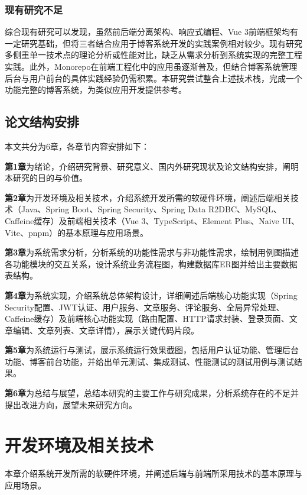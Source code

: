 \documentclass[UTF8,AutoFakeBold=1,AutoFakeSlant,zihao=-4]{SCAU}
\begin{document}
\subsubsection{现有研究不足}

综合现有研究可以发现，虽然前后端分离架构、响应式编程、Vue 3前端框架均有一定研究基础，但将三者结合应用于博客系统开发的实践案例相对较少。现有研究多侧重单一技术点的理论分析或性能对比，缺乏从需求分析到系统实现的完整工程实践。此外，Monorepo在前端工程化中的应用虽逐渐普及，但结合博客系统管理后台与用户前台的具体实践经验仍需积累。本研究尝试整合上述技术栈，完成一个功能完整的博客系统，为类似应用开发提供参考。

\subsection{论文结构安排}

本文共分为6章，各章节内容安排如下：

\textbf{第1章}为绪论，介绍研究背景、研究意义、国内外研究现状及论文结构安排，阐明本研究的目的与价值。

\textbf{第2章}为开发环境及相关技术，介绍系统开发所需的软硬件环境，阐述后端相关技术（Java、Spring Boot、Spring Security、Spring Data R2DBC、MySQL、Caffeine缓存）及前端相关技术（Vue 3、TypeScript、Element Plus、Naive UI、Vite、pnpm）的基本原理与应用场景。

\textbf{第3章}为系统需求分析，分析系统的功能性需求与非功能性需求，绘制用例图描述各功能模块的交互关系，设计系统业务流程图，构建数据库ER图并给出主要数据表结构。

\textbf{第4章}为系统实现，介绍系统总体架构设计，详细阐述后端核心功能实现（Spring Security配置、JWT认证、用户服务、文章服务、评论服务、全局异常处理、Caffeine缓存）及前端核心功能实现（路由配置、HTTP请求封装、登录页面、文章编辑、文章列表、文章详情），展示关键代码片段。

\textbf{第5章}为系统运行与测试，展示系统运行效果截图，包括用户认证功能、管理后台功能、博客前台功能，并给出单元测试、集成测试、性能测试的测试用例与测试结果。

\textbf{第6章}为总结与展望，总结本研究的主要工作与研究成果，分析系统存在的不足并提出改进方向，展望未来研究方向。

\section{开发环境及相关技术}

本章介绍系统开发所需的软硬件环境，并阐述后端与前端所采用技术的基本原理与应用场景。
\end{document}
